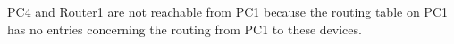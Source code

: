 PC4 and Router1 are not reachable from PC1 because the routing table on PC1 has no entries concerning the routing from PC1 to these devices.
